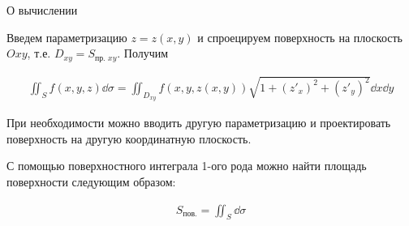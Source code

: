 \begin{remark}
  О вычислении

  Введем параметризацию \(z = z(x, y)\) и спроецируем поверхность на плоскость
  \(Oxy\), т.е. \(D_{xy} = S_{\text{пр. }xy}\). Получим

  \begin{align*}
    \iint_{S} f(x, y, z) \dd \sigma
    = \iint_{D_{xy}} f(x, y, z(x, y))
      \sqrt{1 + (z'_{x})^2 + (z'_{y})^2} \dd x \dd y
  \end{align*}

  При необходимости можно вводить другую параметризацию и проектировать
  поверхность на другую координатную плоскость.
\end{remark}

\begin{remark}
  С помощью поверхностного интеграла 1-ого рода можно найти площадь поверхности
  следующим образом:

  \begin{align*}
    S_{\text{пов.}} = \iint_{S} \dd \sigma
  \end{align*}
\end{remark}
